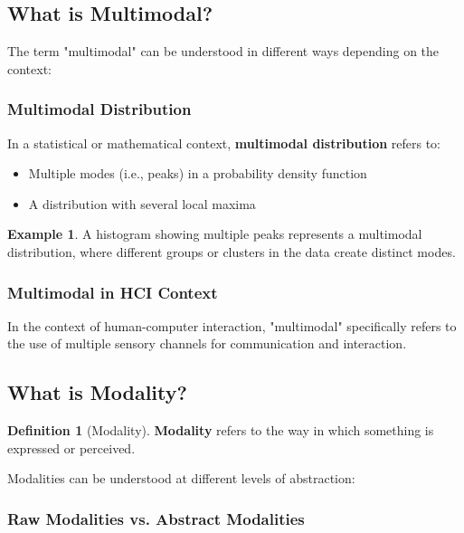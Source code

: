 \documentclass[11pt,a4paper]{article}
\theoremstyle{definition}
\newtheorem{definition}{Definition}[section]
\newtheorem{example}{Example}[section]
\theoremstyle{plain}
\theoremstyle{remark}
\begin{document}
\subsection{What is Multimodal?}

The term "multimodal" can be understood in different ways depending on the context:

\subsubsection{Multimodal Distribution}

In a statistical or mathematical context, \textbf{multimodal distribution} refers to:
\begin{itemize}
    \item Multiple modes (i.e., peaks) in a probability density function
    \item A distribution with several local maxima
\end{itemize}

\begin{example}
A histogram showing multiple peaks represents a multimodal distribution, where different groups or clusters in the data create distinct modes.
\end{example}

\subsubsection{Multimodal in HCI Context}

In the context of human-computer interaction, "multimodal" specifically refers to the use of multiple sensory channels for communication and interaction.

\subsection{What is Modality?}

\begin{definition}[Modality]
\textbf{Modality} refers to the way in which something is expressed or perceived.
\end{definition}

Modalities can be understood at different levels of abstraction:

\subsubsection{Raw Modalities vs. Abstract Modalities}
\end{document}
